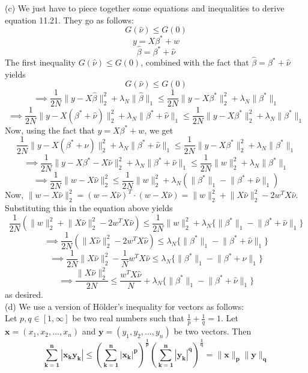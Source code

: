 \documentclass[a4paper,11pt]{article}
\numberwithin{definition}{section}
\numberwithin{mytheorem}{subsection}
\begin{document}
(c) We just have to piece together some equations and inequalities to derive equation 11.21. They go as follows:
$$G(\hat{\nu}) \leq G(0)$$
$$y = X\beta^* + w$$
$$\hat{\beta} = \beta^* + \hat{\nu}$$
The first inequality $G(\hat{\nu}) \leq G(0)$, combined with the fact that $\hat{\beta} = \beta^* + \hat{\nu}$ yields
$$G(\hat{\nu}) \leq G(0)$$
$$\implies \frac{1}{2N}\lVert y - X\hat{\beta}\rVert^2_2 + \lambda_N\lVert\hat{\beta}\rVert_1 \leq \frac{1}{2N}\lVert y - X\beta^{*}\rVert^2_2 + \lambda_N\lVert\beta^{*}\rVert_1$$
$$\implies \frac{1}{2N}\lVert y - X(\beta^* + \hat{\nu})\rVert^2_2 + \lambda_N\lVert\beta^* + \hat{\nu}\rVert_1 \leq \frac{1}{2N}\lVert y - X\beta^{*}\rVert^2_2 + \lambda_N\lVert\beta^{*}\rVert_1$$
Now, using the fact that $y = X\beta^* + w$, we get
$$\frac{1}{2N}\lVert y - X(\beta^* + \hat{\nu})\rVert^2_2 + \lambda_N\lVert\beta^* + \hat{\nu}\rVert_1 \leq \frac{1}{2N}\lVert y - X\beta^{*}\rVert^2_2 + \lambda_N\lVert\beta^{*}\rVert_1$$
$$\implies \frac{1}{2N}\lVert y - X\beta^* - X\hat{\nu}\rVert^2_2 + \lambda_N\lVert\beta^* + \hat{\nu}\rVert_1 \leq \frac{1}{2N}\lVert w\rVert^2_2 + \lambda_N\lVert\beta^{*}\rVert_1$$
$$\implies \frac{1}{2N}\lVert w - X\hat{\nu}\rVert^2_2 \leq \frac{1}{2N}\lVert w\rVert^2_2 + \lambda_N(\lVert\beta^{*}\rVert_1 - \lVert\beta^* + \hat{\nu}\rVert_1)$$
Now, $\lVert w - X\hat{\nu}\rVert^2_2 = (w - X\hat{\nu})^T\cdot(w - X\hat{\nu}) = \lVert w\rVert^2_2 + \lVert X\hat{\nu}\rVert^2_2 - 2w^TX\hat{\nu} $. Substituting this in the equation above yields
$$\frac{1}{2N}(\lVert w\rVert^2_2 + \lVert X\hat{\nu}\rVert^2_2 - 2w^TX\hat{\nu}) \leq \frac{1}{2N}\lVert w\rVert^2_2 + \lambda_N\{\lVert\beta^{*}\rVert_1 - \lVert\beta^* + \hat{\nu}\rVert_1\}$$
$$\implies \frac{1}{2N}(\lVert X\hat{\nu}\rVert^2_2 - 2w^TX\hat{\nu}) \leq \lambda_N\{\lVert\beta^{*}\rVert_1 - \lVert\beta^* + \hat{\nu}\rVert_1\}$$
$$\implies \frac{1}{2N}\lVert X\hat{\nu}\rVert^2_2 - \frac{1}{N}w^TX\hat{\nu}\leq \lambda_N\{\lVert\beta^{*}\rVert_1 - \lVert\beta^* + \hat{\nu}\rVert_1\}$$
$$\implies \frac{\lVert X\hat{\nu}\rVert^2_2}{2N} \leq \frac{w^TX\hat{\nu}}{N} + \lambda_N\{\lVert\beta^{*}\rVert_1 - \lVert\beta^* + \hat{\nu}\rVert_1\}$$
as desired.\\
(d) We use a version of H\"{o}lder's inequality for vectors as follows:\\
Let $p, q\in[1,\infty]$ be two real numbers such that $\frac{1}{p} + \frac{1}{q} = 1$. Let $\boldsymbol{x} = (x_1, x_2, ..., x_n)$ and $\boldsymbol{y} = (y_1, y_2, ..., y_n)$ be two vectors. Then
$$\boldsymbol{\sum^{n}_{k = 1}|x_ky_k|\leq (\sum^{n}_{k = 1}|x_k|^p)^{\frac{1}{p}}(\sum^{n}_{k = 1}|y_k|^q)^{\frac{1}{q}} = \lVert x\rVert_p\lVert y\rVert_q}$$
\end{document}
